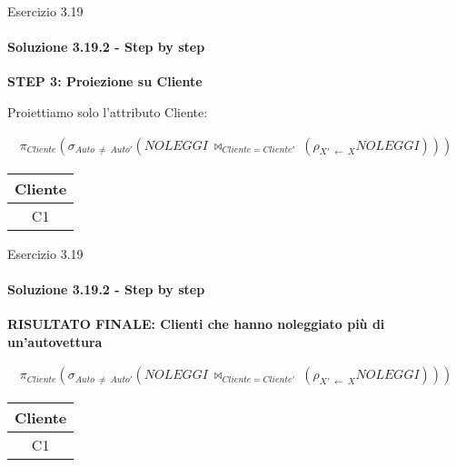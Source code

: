 %
\begin{frame}{Esercizio 3.19}
    \framesubtitle{Soluzione 3.19.2 - Step by step}
    \vspace*{-1cm}

    {\small \textbf{STEP 3: Proiezione su Cliente}}
    
    \vspace{.3cm}

    {\small Proiettiamo solo l'attributo Cliente:}
    
    \small
    \begin{gather*}
        \pi_{Cliente} (\sigma_{Auto~\neq~Auto'} (NOLEGGI~\bowtie_{Cliente=Cliente'}~(\rho_{X'~\leftarrow~X} NOLEGGI)))
    \end{gather*}

    \vspace{.1cm}

    \small
    
    \centering
    
    \begin{tabular}{|c|}
    \hline
    \rowcolor{cyan!30} Cliente \\
    \hline
    C1 \\
    \hline
    \end{tabular}
\end{frame}
\begin{frame}{Esercizio 3.19}
    \framesubtitle{Soluzione 3.19.2 - Step by step}
    \vspace*{-1cm}

    {\small \textbf{RISULTATO FINALE: Clienti che hanno noleggiato pi\`u di un'autovettura}}
    
    \vspace{.3cm}
    
    \small
    \begin{gather*}
        \pi_{Cliente} (\sigma_{Auto~\neq~Auto'} (NOLEGGI~\bowtie_{Cliente=Cliente'}~(\rho_{X'~\leftarrow~X} NOLEGGI)))
    \end{gather*}

    \vspace{.1cm}

    \small
    
    \centering
    
    \begin{tabular}{|c|}
    \hline
    \rowcolor{cyan!30} Cliente \\
    \hline
    C1 \\
    \hline
    \end{tabular}
\end{frame}
